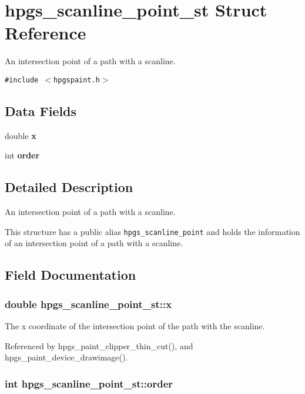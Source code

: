 \section{hpgs\_\-scanline\_\-point\_\-st Struct Reference}
\label{structhpgs__scanline__point__st}
An intersection point of a path with a scanline.  


{\tt \#include $<$hpgspaint.h$>$}

\subsection*{Data Fields}
\begin{CompactItemize}
\item 
double {\bf x}
\item 
int {\bf order}
\end{CompactItemize}


\subsection{Detailed Description}
An intersection point of a path with a scanline. 

This structure has a public alias {\tt hpgs\_\-scanline\_\-point} and holds the information of an intersection point of a path with a scanline. 

\subsection{Field Documentation}
\subsubsection[x]{\setlength{\rightskip}{0pt plus 5cm}double {\bf hpgs\_\-scanline\_\-point\_\-st::x}}\label{structhpgs__scanline__point__st_573f70a9bc32ab4c5bf6cb3d32cc2ce3}


The x coordinate of the intersection point of the path with the scanline. 

Referenced by hpgs\_\-paint\_\-clipper\_\-thin\_\-cut(), and hpgs\_\-paint\_\-device\_\-drawimage().
\subsubsection[order]{\setlength{\rightskip}{0pt plus 5cm}int {\bf hpgs\_\-scanline\_\-point\_\-st::order}}\label{structhpgs__scanline__point__st_dd5b602518f4cb82caa6f337ef2df81b}


